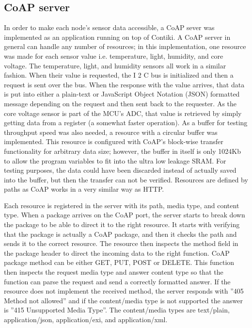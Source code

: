 \subsection{CoAP server}

In order to make each node’s sensor data accessible,
	a CoAP sever was implemented as an application running on top of Contiki.
A CoAP server in general can handle any number of resources;
	in this implementation,
	one resource was made for each sensor value i.e.
temperature,
	light,
	humidity,
	and core voltage.
The temperature,
	light,
	and humidity sensors all work in a similar fashion.
When their value is requested,
	the I 2 C bus is initialized and then a request is sent over the bus.
When the response with the value arrives,
	that data is put into either a plain-text or JavaScript Object Notation (JSON) formatted message depending on the request and then sent back to the requester.
As the core voltage sensor is part of the MCU’s ADC,
	that value is retrieved by simply getting data from a register (a somewhat faster operation).
As a buffer for testing throughput speed was also needed,
	a resource with a circular buffer was implemented.
This resource is configured with CoAP’s block-wise transfer functionality for arbitrary data size;
	however,
	the buffer in itself is only 1024Kb to allow the program variables to fit into the ultra low leakage SRAM.
For testing purposes,
	the data could have been discarded instead of actually saved into the buffer,
	but then the transfer can not be verified.
Resources are defined by paths as CoAP works in a very similar way as HTTP.

Each resource is registered in the server with its path,
	media type,
	and content type.
When a package arrives on the CoAP port,
	the server starts to break down the package to be able to direct it to the right resource.
It starts with verifying that the package is actually a CoAP package,
	and then it checks the path and sends it to the correct resource.
The resource then inspects the method field in the package header to direct the incoming data to the right function.
CoAP package method can be either GET,
	PUT,
	POST or DELETE.
This function then inspects the request media type and answer content type so that the function can parse the request and send a correctly formatted answer.
If the resource does not implement the received method,
	the server responds with ”405 Method not allowed” and if the content/media type is not supported the answer is ”415 Unsupported Media Type”.
The content/media types are text/plain,
	application/json,
	application/exi,
	and application/xml.

